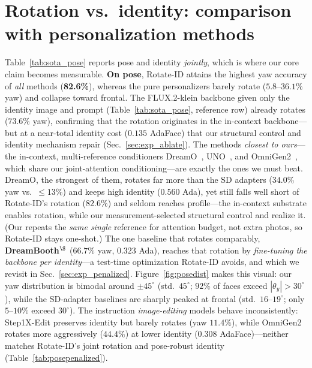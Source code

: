 \section{Rotation vs.\ identity: comparison with personalization methods}
Table~\ref{tab:sota_pose} reports pose and identity \emph{jointly}, which is
where our core claim becomes measurable. \textbf{On pose}, Rotate-ID attains the
highest yaw accuracy of \emph{all} methods (\textbf{82.6\%}), whereas the pure
personalizers barely rotate ($5.8\text{--}36.1\%$ yaw) and collapse toward
frontal. The FLUX.2-klein backbone given only the identity image and prompt
(Table~\ref{tab:sota_pose}, reference row) already rotates ($73.6\%$ yaw),
confirming that the rotation originates in the in-context backbone---but at a
near-total identity cost ($0.135$ AdaFace) that our structural control and
identity mechanism repair (Sec.~\ref{sec:exp_ablate}). The methods \emph{closest to ours}---the in-context, multi-reference
conditioners DreamO~\cite{dreamo}, UNO~\cite{uno}, and OmniGen2~\cite{omnigen2},
which share our joint-attention conditioning---are exactly the ones we must beat.
DreamO, the strongest of them, rotates far more
than the SD adapters ($34.0\%$ yaw vs.\ $\leq\!13\%$) and keeps high identity
($0.560$ Ada), yet still falls well short of Rotate-ID's rotation ($82.6\%$) and
seldom reaches profile---the in-context substrate enables rotation, while our
measurement-selected structural control and \gate{} realize it. (Our \dupid{}
repeats the \emph{same single} reference for attention budget, not extra photos, so
Rotate-ID stays one-shot.) The one baseline that rotates
comparably, \textbf{DreamBooth}$^\S$ ($66.7\%$ yaw, $0.323$ Ada), reaches that
rotation by \emph{fine-tuning the backbone per identity}---a test-time optimization
Rotate-ID avoids, and which we revisit in Sec.~\ref{sec:exp_penalized}.
Figure~\ref{fig:posedist} makes this visual: our yaw distribution is
bimodal around $\pm45^\circ$ (std.\ $45^\circ$; $92\%$ of faces exceed
$|{\theta_y}|{>}30^\circ$), while the SD-adapter baselines are sharply peaked at
frontal (std.\ $16\text{--}19^\circ$; only $5\text{--}10\%$ exceed $30^\circ$). The
instruction \emph{image-editing} models behave inconsistently: Step1X-Edit
preserves identity but barely rotates (yaw $11.4\%$), while OmniGen2 rotates more
aggressively ($44.4\%$) at lower identity ($0.308$ AdaFace)---neither matches
Rotate-ID's joint rotation and pose-robust identity (Table~\ref{tab:posepenalized}).

